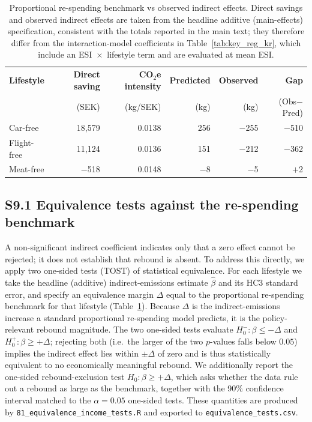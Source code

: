 \documentclass[12pt]{article}
\begin{document}
\begin{table}[!htbp]
\centering
\small
\caption{Proportional re-spending benchmark vs observed indirect effects. Direct savings and observed indirect effects are taken from the headline additive (main-effects) specification, consistent with the totals reported in the main text; they therefore differ from the interaction-model coefficients in Table~\ref{tab:key_reg_kr}, which include an ESI~$\times$~lifestyle term and are evaluated at mean ESI.}
\label{tab:benchmark_rebound}
\begin{tabular}{lrrrrr}
\toprule
\textbf{Lifestyle} & \textbf{Direct saving} & \textbf{CO$_2$e intensity} & \textbf{Predicted} & \textbf{Observed} & \textbf{Gap} \\
 & (SEK) & (kg/SEK) & (kg) & (kg) & (Obs$-$Pred) \\
\midrule
Car-free & 18{,}579 & 0.0138 & 256 & $-$255 & $-$510 \\
Flight-free & 11{,}124 & 0.0136 & 151 & $-$212 & $-$362 \\
Meat-free & $-$518 & 0.0148 & $-$8 & $-$5 & $+$2 \\
\bottomrule
\end{tabular}
\end{table}

\subsection*{S9.1 Equivalence tests against the re-spending benchmark}

A non-significant indirect coefficient indicates only that a zero effect cannot be rejected; it does not establish that rebound is absent. To address this directly, we apply two one-sided tests (TOST) of statistical equivalence. For each lifestyle we take the headline (additive) indirect-emissions estimate $\hat\beta$ and its HC3 standard error, and specify an equivalence margin $\Delta$ equal to the proportional re-spending benchmark for that lifestyle (Table~\ref{tab:benchmark_rebound}). Because $\Delta$ is the indirect-emissions increase a standard proportional re-spending model predicts, it is the policy-relevant rebound magnitude. The two one-sided tests evaluate $H_0^{-}:\beta \le -\Delta$ and $H_0^{+}:\beta \ge +\Delta$; rejecting both (i.e.\ the larger of the two $p$-values falls below $0.05$) implies the indirect effect lies within $\pm\Delta$ of zero and is thus statistically equivalent to no economically meaningful rebound. We additionally report the one-sided rebound-exclusion test $H_0:\beta \ge +\Delta$, which asks whether the data rule out a rebound as large as the benchmark, together with the 90\% confidence interval matched to the $\alpha=0.05$ one-sided tests. These quantities are produced by \texttt{81\_equivalence\_income\_tests.R} and exported to \texttt{equivalence\_tests.csv}.
\end{document}

